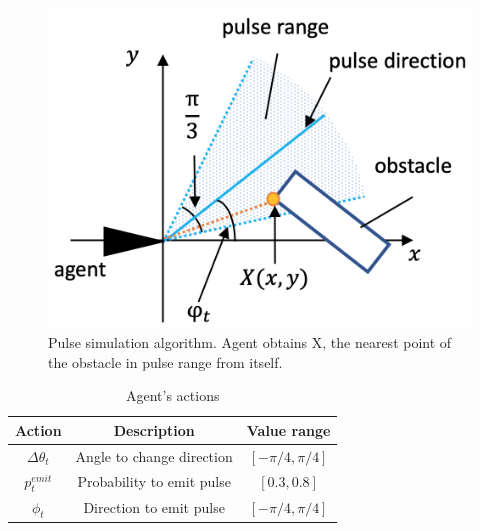 \documentclass[../main]{subfiles}
\begin{document}
\newpage
{}
\begin{figure}[H]
  \centering
  \vfill
  \includegraphics[width=12cm]{figures/pulse_simulation.png}
  \caption{
    Pulse simulation algorithm. Agent obtains X,
    the nearest point of the obstacle in pulse range from itself.
  }\label{fig:pulse_simulation}
\end{figure}

\newpage
{}
\begin{table}[H]
  \caption{Agent's actions}\label{tab:agent_actions}
  \centering
    \begin{tabular}{c|c|c}
      Action & Description & Value range \\ \hline
      $\Delta\theta_t$ & Angle to change direction & $[-\pi/4, \pi/4]$ \\
      $p^{emit}_t$ & Probability to emit pulse & $[0.3, 0.8]$ \\
      $\phi_t$ & Direction to emit pulse & $[-\pi/4, \pi/4]$ \\
    \end{tabular}
\end{table}
\end{document}
